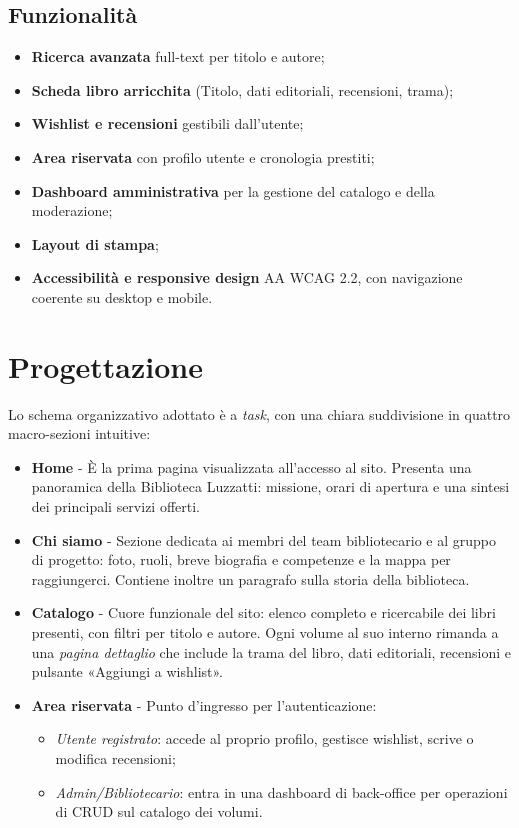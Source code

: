 \documentclass{article}
\begin{document}
\subsection{Funzionalità}
\begin{itemize}
    \item \textbf{Ricerca avanzata} full-text per titolo e autore;
    \item \textbf{Scheda libro arricchita} (Titolo, dati editoriali, recensioni, trama);
    \item \textbf{Wishlist e recensioni} gestibili dall'utente;
    \item \textbf{Area riservata} con profilo utente e cronologia prestiti;
    \item \textbf{Dashboard amministrativa} per la gestione del catalogo e della moderazione;
    \item \textbf{Layout di stampa};
    \item \textbf{Accessibilità e responsive design} AA WCAG 2.2, con navigazione coerente su desktop e mobile.
\end{itemize}


\section{Progettazione}
Lo schema organizzativo adottato è a \emph{task}, con una chiara suddivisione in quattro macro-sezioni intuitive:

\begin{itemize}
    \item \textbf{Home} - È la prima pagina visualizzata all'accesso al sito.  
          Presenta una panoramica della Biblioteca Luzzatti: missione, orari di apertura e una sintesi dei principali servizi offerti.
    
    \item \textbf{Chi siamo} - Sezione dedicata ai membri del team bibliotecario e al gruppo di progetto: foto, ruoli, breve biografia e competenze e la mappa per raggiungerci. Contiene inoltre un paragrafo sulla storia della biblioteca.
          
    \item \textbf{Catalogo} - Cuore funzionale del sito: elenco completo e ricercabile dei libri presenti, con filtri per titolo e autore. Ogni volume al suo interno rimanda a una \emph{pagina dettaglio} che include la trama del libro, dati editoriali, recensioni e pulsante «Aggiungi a wishlist».
    
    \item \textbf{Area riservata} - Punto d'ingresso per l'autenticazione:  
          \begin{itemize}
              \item \emph{Utente registrato}: accede al proprio profilo, gestisce wishlist, scrive o modifica recensioni;  
              \item \emph{Admin/Bibliotecario}: entra in una dashboard di back-office per operazioni di CRUD sul catalogo dei volumi.
          \end{itemize}
\end{itemize}
\end{document}
